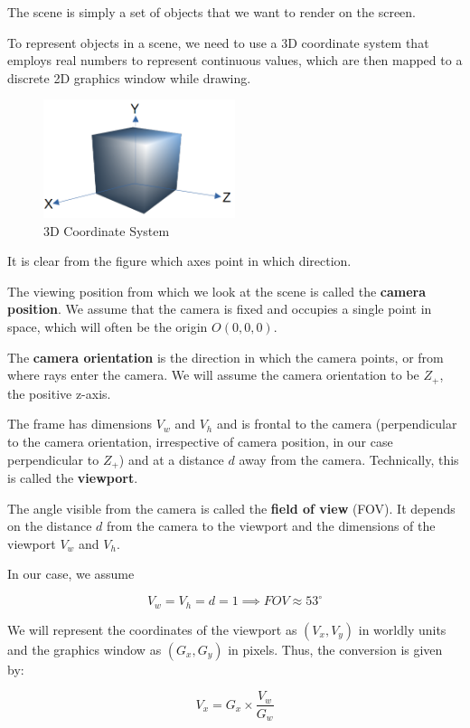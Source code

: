 \documentclass{article}
\begin{document}
The scene is simply a set of objects that we want to render on the screen.

To represent objects in a scene, we need to use a 3D coordinate system that employs real numbers to represent continuous values, which are then mapped to a discrete 2D graphics window while drawing.

\begin{figure}[h]
    \centering
    \includegraphics[width=0.5\textwidth]{./figs/3Dcoodinate.png}
    \caption{3D Coordinate System}
\end{figure}

It is clear from the figure which axes point in which direction.

The viewing position from which we look at the scene is called the \textbf{camera position}. We assume that the camera is fixed and occupies a single point in space, which will often be the origin $O(0,0,0)$.

The \textbf{camera orientation} is the direction in which the camera points, or from where rays enter the camera. We will assume the camera orientation to be $Z_+$, the positive z-axis.

The frame has dimensions $V_w$ and $V_h$ and is frontal to the camera (perpendicular to the camera orientation, irrespective of camera position, in our case perpendicular to $Z_+$) and at a distance $d$ away from the camera. Technically, this is called the \textbf{viewport}.

The angle visible from the camera is called the \textbf{field of view} (FOV). It depends on the distance $d$ from the camera to the viewport and the dimensions of the viewport $V_w$ and $V_h$.

In our case, we assume 

$$V_w = V_h = d = 1 \implies FOV \approx 53^\circ$$

We will represent the coordinates of the viewport as $(V_x,V_y)$ in worldly units and the graphics window as $(G_x,G_y)$ in pixels. Thus, the conversion is given by:

$$V_x = G_x \times \frac{V_w}{G_w}$$
\end{document}
